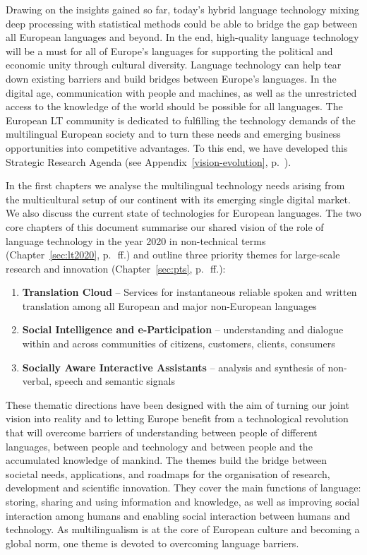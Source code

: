 \documentclass[10pt, plain]{../../metanetpaper}
\begin{document}
\begin{multicols}{2}
Drawing on the insights gained so far, today’s hybrid language technology mixing deep processing with statistical methods could be able to bridge the gap between all European languages and beyond. In the end, high-quality language technology will be a must for all of Europe's languages for supporting the political and economic unity through cultural diversity. Language technology can help tear down existing barriers and build bridges between Europe’s languages. In the digital age, communication with people and machines, as well as the unrestricted access to the knowledge of the world should be possible for all languages. The European LT community is dedicated to fulfilling the technology demands of the multilingual European society and to turn these needs and emerging business opportunities into competitive advantages. To this end, we have developed this Strategic Research Agenda (see Appendix~\ref{vision-evolution}, p.~\pageref{vision-evolution}).

In the first chapters we analyse the multilingual technology needs arising from the multicultural setup of our continent with its emerging single digital market. We also discuss the current state of technologies for European languages. The two core chapters of this document summarise our shared vision of the role of language technology in the year 2020 in non-technical terms (Chapter~\ref{sec:lt2020}, p.~\pageref{sec:lt2020}\,ff.) and outline three priority themes for large-scale research and innovation (Chapter~\ref{sec:pts}, p.~\pageref{sec:pts}\,ff.):

\begin{enumerate}
\item \textbf{Translation Cloud} -- Services for instantaneous reliable spoken and written translation among all European and major non-European languages
\item \textbf{Social Intelligence and e-Participation} -- understanding and dialogue within and across communities of citizens, customers, clients, consumers
\item \textbf{Socially Aware Interactive Assistants} -- analysis and synthesis of non-verbal, speech and semantic signals
\end{enumerate}
 
These thematic directions have been designed with the aim of turning our joint vision into reality and to letting Europe benefit from a technological revolution that will overcome barriers of understanding between people of different languages, between people and technology and between people and the accumulated knowledge of mankind. The themes build the bridge between societal needs, applications, and roadmaps for the organisation of research, development and scientific innovation. They cover the main functions of language: storing, sharing and using information and knowledge, as well as improving social interaction among humans and enabling social interaction between humans and technology. As multilingualism is at the core of European culture and becoming a global norm, one theme is devoted to overcoming language barriers.


\end{multicols}
\end{document}
